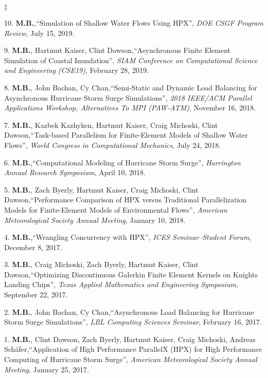 \documentclass[margin,line]{res}
\newenvironment{list2}{
  \begin{list}{$\ddagger$}{%
      \setlength{\itemsep}{0in}
      \setlength{\parsep}{0in} \setlength{\parskip}{0in}
      \setlength{\topsep}{0in} \setlength{\partopsep}{0in}
      \setlength{\leftmargin}{0.2in}}}{\end{list}}
\newcommand{\talk}[4]{%
#1,``#2'', {\it #3}, #4.%
}
\begin{document}
\begin{resume}
\begin{list2}
\item[10.] \talk{{\bf M.B.}}{Simulation of Shallow Water Flows Using HPX}{DOE CSGF Program Review}{July 15, 2019}

\item[9.] \talk{{\bf M.B.}, Hartmut Kaiser, Clint Dawson}{Asynchronous Finite Element Simulation of Coastal Inundation}{SIAM Conference on Computational Science and Engineering (CSE19)}{February 28, 2019}

\item[8.] \talk{{\bf M.B.}, John Bachan, Cy Chan}{Semi-Static and Dynamic Load Balancing for Asynchronous Hurricane Storm Surge Simulations}{2018 IEEE/ACM Parallel Applications Workshop, Alternatives To MPI (PAW-ATM)}{November 16, 2018}

\item[7.] \talk{{\bf M.B.}, Kazbek Kazhyken, Hartmut Kaiser, Craig Michoski, Clint Dawson}{Task-based Parallelism for Finite-Element Models of Shallow Water Flows}{World Congress in Computational Mechanics}{July 24, 2018}

\item[6.] \talk{{\bf M.B.}}{Computational Modeling of Hurricane Storm Surge}{Harrington Annual Research Symposium}{April 10, 2018}

\item[5.] \talk{{\bf M.B.}, Zach Byerly, Hartmut Kaiser, Craig Michoski, Clint Dawson}{Performance Comparison of HPX versus Traditional Parallelization Models for Finite-Element Models of Environmental Flows}{American Meteorological Society Annual Meeting}{January 10, 2018}

\item[4.] \talk{{\bf M.B.}}{Wrangling Concurrency with HPX}{ICES Seminar--Student Forum}{December 8, 2017}

\item[3.] \talk{{\bf M.B.}, Craig Michoski, Zach Byerly, Hartmut Kaiser, Clint Dawson}{Optimizing Discontinuous Galerkin Finite Element Kernels on Knights Landing Chips}{Texas Applied Mathematics and Engineering Symposium}{September 22, 2017}

\item[2.] \talk{{\bf M.B.}, John Bachan, Cy Chan}{Asynchronous Load Balancing for Hurricane Storm Surge Simulations}{LBL Computing Sciences Seminar}{February 16, 2017}

\item[1.] \talk{{\bf M.B.}, Clint Dawson, Zach Byerly, Hartmut Kaiser, Craig Michoski, Andreas Sch\"afer}{Application of High Performance ParallelX (HPX) for High Performance Computing of Hurricane Storm Surge}{American Meteorological Society Annual Meeting}{January 25, 2017}
\end{list2}


\end{resume}
\end{document}
